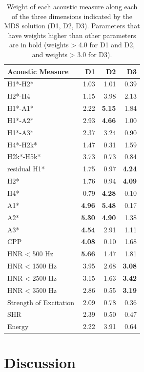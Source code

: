 \begin{table}[ht]
    \centering
    \caption{Weight of each acoustic measure along each of the three dimensions indicated by the MDS solution (D1, D2, D3). Parameters that have weights higher than other parameters are in bold (weights > 4.0 for D1 and D2, and weights > 3.0 for D3).} 
    \label{tab:acoustic_correlates}
    \begin{tabular}{lrrr}
    \hline
    Acoustic Measure & D1 & D2 & D3 \\ 
    \hline
    H1*-H2* & 1.03 & 1.01 & 0.39 \\ 
    H2*-H4 & 1.15 & 3.98 & 2.13 \\ 
    H1*-A1* & 2.22 & \textbf{5.15} & 1.84 \\ 
    H1*-A2* & 2.93 & \textbf{4.66} & 1.00 \\ 
    H1*-A3* & 2.37 & 3.24 & 0.90 \\ 
    H4*-H2k* & 1.47 & 0.31 & 1.59 \\ 
    H2k*-H5k* & 3.73 & 0.73 & 0.84 \\ 
    residual H1* & 1.75 & 0.97 & \textbf{4.24} \\ 
    H2* & 1.76 & 0.94 & \textbf{4.09} \\ 
    H4* & 0.79 & \textbf{4.28} & 0.10 \\ 
    A1* & \textbf{4.96} & \textbf{5.48} & 0.17 \\ 
    A2* & \textbf{5.30} & \textbf{4.90} & 1.38 \\ 
    A3* & \textbf{4.54} & 2.91 & 1.11 \\ 
    CPP & \textbf{4.08} & 0.10 & 1.68 \\ 
    HNR < 500 Hz & \textbf{5.66} & 1.47 & 1.81 \\ 
    HNR < 1500 Hz & 3.95 & 2.68 & \textbf{3.08} \\ 
    HNR < 2500 Hz & 3.15 & 1.63 & \textbf{3.42} \\ 
    HNR < 3500 Hz & 2.86 & 0.55 & \textbf{3.19} \\ 
    Strength of Excitation & 2.09 & 0.78 & 0.36 \\ 
    SHR & 2.39 & 0.50 & 0.47 \\ 
    Energy & 2.22 & 3.91 & 0.64 \\ 
    \hline
    \end{tabular}
\end{table}

\section{Discussion} \label{sec:acousticlandscape:discussion}


